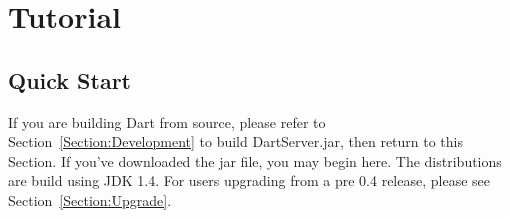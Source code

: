 \documentclass{InsightBook}
\begin{document}
\chapter{Tutorial}

\section{Quick Start}
\label{Section:QuickStart}

If you are building Dart from source, please refer to
Section~\ref{Section:Development} to build DartServer.jar, then return
to this Section.  If you've downloaded the jar file, you may begin
here.  The distributions are build using JDK 1.4.  For users upgrading
from a pre 0.4 release, please see Section~\ref{Section:Upgrade}.
\end{document}
